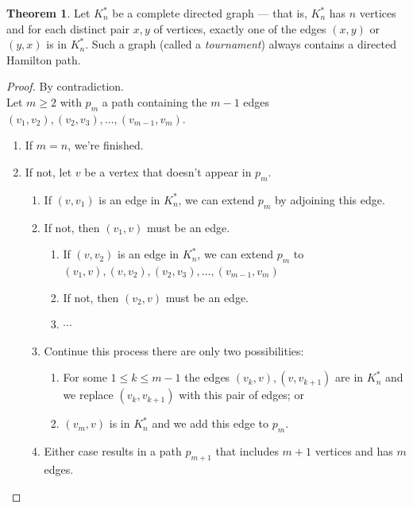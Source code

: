\documentclass[letter]{book}
\theoremstyle{definition}
\newtheorem{theorem}{Theorem}[chapter]
\theoremstyle{definition}
\theoremstyle{remark}
\begin{document}
\bigskip
\begin{theorem}
    Let $K_n^*$ be a complete directed graph --- that is, $K_n^*$ has $n$ vertices and for each distinct pair $x,y$ of vertices, exactly one of the edges $(x,y)$ or $(y,x)$ is in $K_n^*$. Such a graph (called a \textit{tournament}) always contains a directed Hamilton path.
\end{theorem}
\begin{proof} By contradiction.\\
Let $m\geq2$ with $p_m$ a path containing the $m-1$ edges $(v_1,v_2),(v_2,v_3),\ldots, (v_{m-1}, v_m)$. 
    \begin{enumerate}
        \item If $m=n$, we're finished.
        \item If not, let $v$ be a vertex that doesn't appear in $p_m$.
            \begin{enumerate}
                \item If $(v,v_1)$ is an edge in $K_n^*$, we can extend $p_m$ by adjoining this edge. 
                \item If not, then $(v_1,v)$ must be an edge.
                    \begin{enumerate}
                        \item If $(v,v_2)$ is an edge in $K_n^*$, we can extend $p_m$ to $(v_1,v),(v,v_2),(v_2,v_3),\ldots, (v_{m-1},v_m)$
                        \item If not, then $(v_2,v)$ must be an edge.
                        \item $\cdots$
                    \end{enumerate}
                \item Continue this process there are only two possibilities:
                    \begin{enumerate}
                        \item For some $1\leq k\leq m-1$ the edges $(v_k,v),(v,v_{k+1})$ are in $K_n^*$ and we replace $(v_k,v_{k+1})$ with this pair of edges; or
                        \item $(v_m,v)$ is in $K_n^*$ and we add this edge to $p_m$.
                    \end{enumerate}
                \item Either case results in a path $p_{m+1}$ that includes $m+1$ vertices and has $m$ edges.
            \end{enumerate}
    \end{enumerate}
\end{proof}
\end{document}
